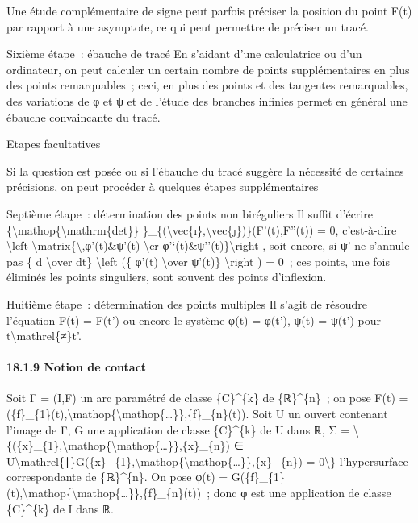 \documentclass[]{article}
\begin{document}
Une étude complémentaire de signe peut parfois préciser la position du
point F(t) par rapport à une asymptote, ce qui peut permettre de
préciser un tracé.

Sixième étape~: ébauche de tracé En s'aidant d'une calculatrice ou d'un
ordinateur, on peut calculer un certain nombre de points supplémentaires
en plus des points remarquables~; ceci, en plus des points et des
tangentes remarquables, des variations de φ et ψ et de l'étude des
branches infinies permet en général une ébauche convaincante du tracé.

Etapes facultatives

Si la question est posée ou si l'ébauche du tracé suggère la nécessité
de certaines précisions, on peut procéder à quelques étapes
supplémentaires

Septième étape~: détermination des points non biréguliers Il suffit
d'écrire \{\textbackslash{}mathop\{\textbackslash{}mathrm\{det\}\}
\}\_\{(\textbackslash{}vec\{ı\},\textbackslash{}vec\{ȷ\})\}(F'(t),F''(t))
= 0, c'est-à-dire \textbackslash{}left
\textbar{}\textbackslash{}matrix\{\textbackslash{},φ'(t)\&ψ'(t)
\textbackslash{}cr φ'`(t)\&ψ''(t)\}\textbackslash{}right \textbar{},
soit encore, si ψ' ne s'annule pas \{ d \textbackslash{}over dt\}
\textbackslash{}left (\{ φ'(t) \textbackslash{}over ψ'(t)\}
\textbackslash{}right ) = 0~; ces points, une fois éliminés les points
singuliers, sont souvent des points d'inflexion.

Huitième étape~: détermination des points multiples Il s'agit de
résoudre l'équation F(t) = F(t') ou encore le système φ(t) = φ(t'), ψ(t)
= ψ(t') pour t\textbackslash{}mathrel\{≠\}t'.

\paragraph{18.1.9 Notion de contact}

Soit Γ = (I,F) un arc paramétré de classe \{C\}\^{}\{k\} de
\{ℝ\}\^{}\{n\}~; on pose F(t) =
(\{f\}\_\{1\}(t),\textbackslash{}mathop\{\textbackslash{}mathop\{\ldots{}\}\},\{f\}\_\{n\}(t)).
Soit U un ouvert contenant l'image de Γ, G une application de classe
\{C\}\^{}\{k\} de U dans ℝ, Σ =
\textbackslash{}\{(\{x\}\_\{1\},\textbackslash{}mathop\{\textbackslash{}mathop\{\ldots{}\}\},\{x\}\_\{n\})
∈
U\textbackslash{}mathrel\{∣\}G(\{x\}\_\{1\},\textbackslash{}mathop\{\textbackslash{}mathop\{\ldots{}\}\},\{x\}\_\{n\})
= 0\textbackslash{}\} l'hypersurface correspondante de \{ℝ\}\^{}\{n\}.
On pose φ(t) =
G(\{f\}\_\{1\}(t),\textbackslash{}mathop\{\textbackslash{}mathop\{\ldots{}\}\},\{f\}\_\{n\}(t))~;
donc φ est une application de classe \{C\}\^{}\{k\} de I dans ℝ.
\end{document}
